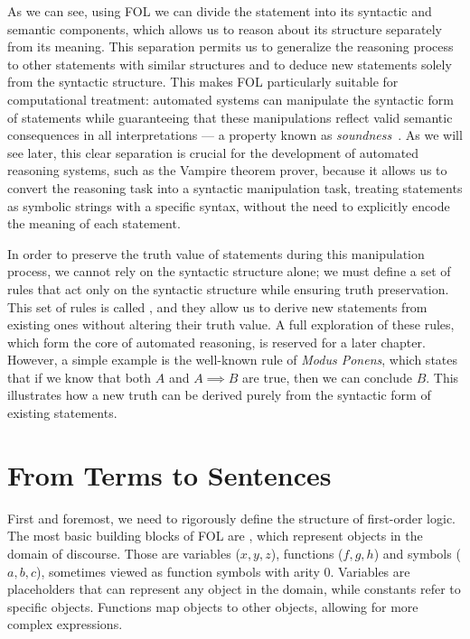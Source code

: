 As we can see, using FOL we can divide the statement into its syntactic and semantic components, which allows us to reason about its structure separately from its meaning.
This separation permits us to generalize the reasoning process to other statements with similar structures and to deduce new statements solely from the syntactic structure.
This makes FOL particularly suitable for computational treatment: automated systems can manipulate the syntactic form of statements while guaranteeing that these manipulations reflect valid semantic consequences in all interpretations — a property known as \emph{soundness}~\cite{enderton2001}.
As we will see later, this clear separation is crucial for the development of automated reasoning systems, such as the Vampire theorem prover, because it allows us to convert the reasoning task into a syntactic manipulation task, treating statements as symbolic strings with a specific syntax, without the need to explicitly encode the meaning of each statement.

In order to preserve the truth value of statements during this manipulation process, we cannot rely on the syntactic structure alone; we must define a set of rules that act only on the syntactic structure while ensuring truth preservation.
This set of rules is called , and they allow us to derive new statements from existing ones without altering their truth value.
A full exploration of these rules, which form the core of automated reasoning, is reserved for a later chapter. However, a simple example is the well-known rule of \emph{Modus Ponens}, which states that if we know that both \(A\) and \(A\implies B\) are true, then we can conclude \(B\). This illustrates how a new truth can be derived purely from the syntactic form of existing statements.

\section{From Terms to Sentences}\label{sec:from-terms-to-sentences}

First and foremost, we need to rigorously define the structure of first-order logic.
The most basic building blocks of FOL are , which represent objects in the domain of discourse.
Those are variables (\(x,y,z\)), functions (\(f,g,h\)) and  symbols (\(a,b,c\)), sometimes viewed as function symbols with arity 0.
Variables are placeholders that can represent any object in the domain, while constants refer to specific objects. Functions map objects to other objects, allowing for more complex expressions.

